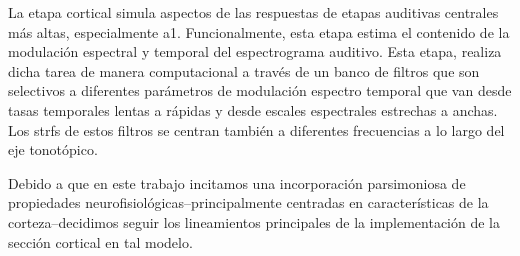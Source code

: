 
La etapa cortical simula aspectos de las respuestas de etapas auditivas centrales más altas, especialmente \gls{a1}. Funcionalmente, esta etapa estima el contenido de la modulación espectral y temporal del espectrograma auditivo. Esta etapa, realiza dicha tarea de manera computacional a través de un banco de filtros que son selectivos a diferentes parámetros de modulación espectro temporal que van desde tasas temporales lentas a rápidas y desde escales espectrales estrechas a anchas. Los \glspl{strf} de estos filtros se centran también a diferentes frecuencias a lo largo del eje tonotópico.


Debido a que en este trabajo incitamos una incorporación parsimoniosa de propiedades neurofisiológicas--principalmente centradas en características de la corteza--decidimos seguir los lineamientos principales de la implementación de la sección cortical en tal modelo.


